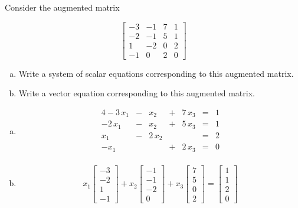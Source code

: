
\begin{exerciseStatement}


 Consider the augmented matrix 

\[ \left[\begin{array}{ccc|c}
-3 & -1 & 7 & 1 \\
-2 & -1 & 5 & 1 \\
1 & -2 & 0 & 2 \\
-1 & 0 & 2 & 0
\end{array}\right] \]
\begin{enumerate}[(a)]
\item  Write a system of scalar equations corresponding to this augmented matrix. 
\item  Write a vector equation corresponding to this augmented matrix. 
\end{enumerate}
    
\end{exerciseStatement}
    
\begin{exerciseAnswer} 

\begin{enumerate}[(a)]
\item 
\begin{alignat*}{4} -3 \, x_{1} &-& x_{2} &+& 7 \, x_{3} &=& 1 \\-2 \, x_{1} &-& x_{2} &+& 5 \, x_{3} &=& 1 \\x_{1} &-& 2 \, x_{2} & &  &=& 2 \\-x_{1} & &  &+& 2 \, x_{3} &=& 0 \\ \end{alignat*}
            
\item \[ x_{1} \left[\begin{array}{c}
-3 \\
-2 \\
1 \\
-1
\end{array}\right] + x_{2} \left[\begin{array}{c}
-1 \\
-1 \\
-2 \\
0
\end{array}\right] + x_{3} \left[\begin{array}{c}
7 \\
5 \\
0 \\
2
\end{array}\right] = \left[\begin{array}{c}
1 \\
1 \\
2 \\
0
\end{array}\right] \]
\end{enumerate}
    
\end{exerciseAnswer}
    
